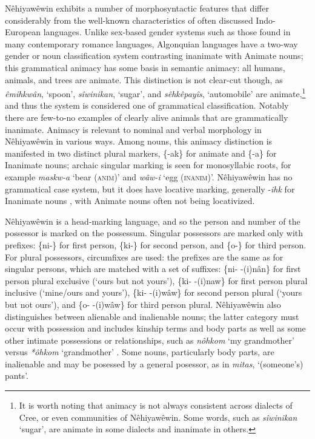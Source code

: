 Nêhiyawêwin exhibits a number of morphosyntactic features that differ considerably from the well-known characteristics of often discussed Indo-European languages. Unlike sex-based gender systems such as those found in many contemporary romance languages, Algonquian languages have a two-way gender or noun classification system contrasting inanimate with Animate nouns; this grammatical animacy has some basis in semantic animacy: all humans, animals, and trees are animate. This distinction is not clear-cut though, as \textit{\^{e}mihkw\^{a}n}, `spoon', \textit{sîwinikan}, `sugar', and \textit{sêhkêpayîs}, `automobile' are animate,\footnote{It is worth noting that animacy is not always consistent across dialects of Cree, or even communities of Nêhiyawêwin. Some words, such as \textit{s\^{i}winikan} `sugar', are animate in some dialects and inanimate in others.} and thus the system is considered one of grammatical classification. Notably there are few-to-no examples of clearly alive animals that are grammatically inanimate. Animacy is relevant to nominal and verbal morphology in Nêhiyawêwin in various ways. Among nouns, this animacy distinction is manifested in two distinct plural markers, \{-ak\} for animate and \{-a\} for Inanimate nouns; archaic singular marking is seen for monosyllabic roots, for example \textit{maskw-a} `bear (\textsc{anim})' and \textit{w\^{a}w-i} `egg (\textsc{inanim})'. Nêhiyawêwin has no grammatical case system, but it does have locative marking, generally -\textit{ihk} for Inanimate nouns \citep{Wolfart1973,Wolfart1996}, with Animate nouns often not being locativized. 

Nêhiyawêwin is a head-marking language, and so the person and number of the possessor is marked on the possessum. Singular possessors are marked only with prefixes: \{ni-\} for first person, \{ki-\} for second person, and \{o-\} for third person. For plural possessors, circumfixes are used: the prefixes are the same as for singular persons, which are matched with a set of suffixes: \{ni- -(i)n\^{a}n\} for first person plural exclusive (`ours but not yours'), \{ki- -(i)naw\} for first person plural inclusive (`mine/ours and yours'), \{ki- -(i)w\^{a}w\} for second person plural (`yours but not ours'), and \{o- -(i)w\^{a}w\} for third person plural. Nêhiyawêwin also distinguishes between alienable and inalienable nouns; the latter category must occur with possession and includes kinship terms and body parts as well as some other intimate possessions or relationships, such as \textit{nôhkom} `my grandmother' versus \textit{*ôhkom} `grandmother' \citep{Wolfart1973,Wolfart1996,Wolvengrey2011}. Some nouns, particularly body parts, are inalienable and may be posessed by a general posessor, as in \textit{mitas}, `(someone's) pants'.

